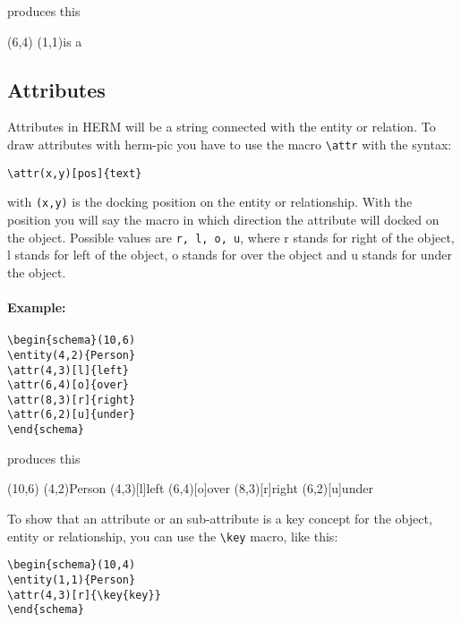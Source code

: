 \documentclass[a4paper,11pt]{article}
\begin{document}
produces this

\begin{schema}(6,4)
\relation(1,1){is a}
\end{schema}

\subsection{Attributes}

Attributes in HERM will be a string connected with the entity or relation.
To draw attributes with herm-pic you have to use the macro \verb|\attr| with the syntax:

\begin{verbatim}
\attr(x,y)[pos]{text}
\end{verbatim}

with {\tt (x,y)} is the docking position on the entity or relationship. With the
position you will say the macro in which direction the attribute will docked on
the object. Possible values are {\tt r, l, o, u}, where r stands for right of the object,
l stands for left of the object, o stands for over the object and u stands for under the object.

\paragraph{Example:}

\begin{verbatim}
\begin{schema}(10,6)
\entity(4,2){Person}
\attr(4,3)[l]{left}
\attr(6,4)[o]{over}
\attr(8,3)[r]{right}
\attr(6,2)[u]{under}
\end{schema}
\end{verbatim}

produces this

\begin{schema}(10,6)
\entity(4,2){Person}
\attr(4,3)[l]{left}
\attr(6,4)[o]{over}
\attr(8,3)[r]{right}
\attr(6,2)[u]{under}
\end{schema}

To show that an attribute or an sub-attribute is a key concept for the object, entity or relationship,
you can use the \verb|\key| macro, like this:

\begin{verbatim}
\begin{schema}(10,4)
\entity(1,1){Person}
\attr(4,3)[r]{\key{key}}
\end{schema}
\end{verbatim}
\end{document}
